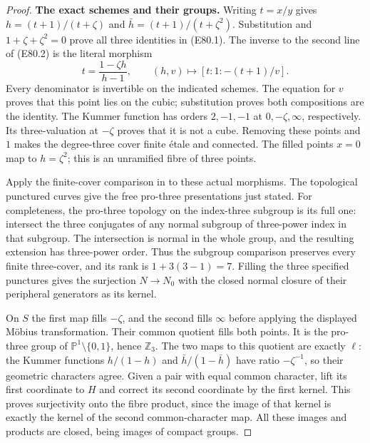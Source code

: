 \begin{proof}
\textbf{The exact schemes and their groups.}
Writing $t=x/y$ gives
$h=(t+1)/(t+\zeta)$ and
$\bar h=(t+1)/(t+\zeta^2)$. Substitution and
$1+\zeta+\zeta^2=0$ prove all three identities
in (E80.1). The inverse to the second line of
(E80.2) is the literal morphism
\[
 t=\frac{1-\zeta h}{h-1},\qquad
       (h,v)\longmapsto[t:1:-(t+1)/v].
 \tag{E80.17}
\]
Every denominator is invertible on the indicated
schemes. The equation for $v$ proves that this
point lies on the cubic; substitution proves both
compositions are the identity. The Kummer function
has orders $2,-1,-1$ at $0,-\zeta,\infty$,
respectively. Its three-valuation at $-\zeta$ proves
that it is not a cube. Removing these points and
$1$ makes the degree-three cover finite \'{e}tale and
connected. The filled points $x=0$ map to $h=\zeta^2$;
this is an unramified fibre of three points.

Apply the finite-cover comparison in
\cite[Expos\'e XII, Theorem 5.1 and Corollary 5.2]{E_SGA1}
to these actual morphisms. The topological punctured
curves give the free pro-three presentations just
stated. For completeness, the pro-three topology on
the index-three subgroup is its full one: intersect
the three conjugates of any normal subgroup of
three-power index in that subgroup. The intersection
is normal in the whole group, and the resulting
extension has three-power order. Thus the subgroup
comparison preserves every finite three-cover,
and its rank is $1+3(3-1)=7$. Filling the three
specified punctures gives the surjection
$N\to N_0$ with the closed normal closure of their
peripheral generators as its kernel.

On $S$ the first map fills $-\zeta$, and the second
fills $\infty$ before applying the displayed
M\"obius transformation. Their common quotient
fills both points. It is the pro-three group of
$\mathbb P^1\setminus\{0,1\}$, hence $\mathbb Z_3$.
The two maps to this quotient are exactly $\ell$:
the Kummer functions $h/(1-h)$ and
$\bar h/(1-\bar h)$ have ratio $-\zeta^{-1}$,
so their geometric characters agree. Given a pair
with equal common character, lift its first
coordinate to $H$ and correct its second coordinate
by the first kernel. This proves surjectivity onto
the fibre product, since the image of that kernel
is exactly the kernel of the second common-character
map. All these images and products are closed,
being images of compact groups.


\end{proof}
